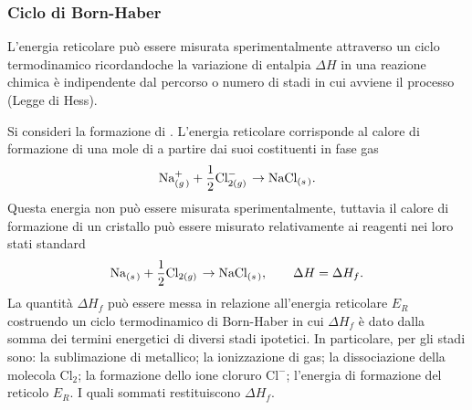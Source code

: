 \subsubsection{Ciclo di Born-Haber}
L'energia reticolare può essere misurata sperimentalmente attraverso un ciclo termodinamico ricordandoche la variazione di entalpia $\Delta H$ in una reazione chimica è indipendente dal percorso o numero di stadi in cui avviene il processo (Legge di Hess). 

Si consideri la formazione di . L'energia reticolare corrisponde al calore di formazione di una mole di  a partire dai suoi costituenti in fase gas
\begin{equation}
    \textnormal{Na}_{\left(g\right.)}^++\frac{1}{2}\textnormal{Cl}_{2\left(g)\right.}^-\to \textnormal{NaCl}_{\left(s\right.)}.
\end{equation}
Questa energia non può essere misurata sperimentalmente, tuttavia il calore di formazione di un cristallo può essere misurato relativamente ai reagenti nei loro stati standard 
\begin{equation}
    \textnormal{Na}_{\left(s\right.)}+\frac{1}{2}\textnormal{Cl}_{2\left(g)\right.}\to \textnormal{NaCl}_{\left(s\right.)},\qquad\Delta H=\Delta H_f.
\end{equation}
La quantità $\Delta H_f$ può essere messa in relazione all'energia reticolare $E_R$ costruendo un ciclo termodinamico di Born-Haber in cui $\Delta H_f$ è dato dalla somma dei termini energetici di diversi stadi ipotetici. In particolare, per  gli stadi sono: la sublimazione di  metallico; la ionizzazione di  gas; la dissociazione della molecola $\text{Cl}_2$; la formazione dello ione cloruro $\text{Cl}^-$; l'energia di formazione del reticolo $E_R$. I quali sommati restituiscono $\Delta H_f$. 


